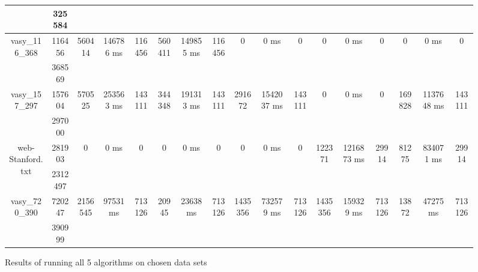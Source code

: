 \documentclass[../master/master.tex]{subfiles}
\begin{document}
\begin{figure}
\begin{tabular}{ |c|c||c|c|c||c|c|c||c|c|c||c|c|c||c|c|c| }
\cline{2-2}
 & 325584  &  &  &  &  &  &  &  &  &  &  &  &  &  &  &  \\
\hline
\multirow{2}{4em}{vasy\_116\_368} & 116456 & \multirow{2}{4em}{560414} & \multirow{2}{4em}{146786 ms} & \multirow{2}{4em}{116456} & \multirow{2}{4em}{560411} & \multirow{2}{4em}{149855 ms} & \multirow{2}{4em}{116456} & \multirow{2}{4em}{0} & \multirow{2}{4em}{0 ms} & \multirow{2}{4em}{0} & \multirow{2}{4em}{0} & \multirow{2}{4em}{0 ms} & \multirow{2}{4em}{0} & \multirow{2}{4em}{0} & \multirow{2}{4em}{0 ms} & \multirow{2}{4em}{0} \\
\cline{2-2}
 & 368569  &  &  &  &  &  &  &  &  &  &  &  &  &  &  &  \\
\hline
\multirow{2}{4em}{vasy\_157\_297} & 157604 & \multirow{2}{4em}{570525} & \multirow{2}{4em}{253563 ms} & \multirow{2}{4em}{143111} & \multirow{2}{4em}{344348} & \multirow{2}{4em}{191313 ms} & \multirow{2}{4em}{143111} & \multirow{2}{4em}{291672} & \multirow{2}{4em}{1542037 ms} & \multirow{2}{4em}{143111} & \multirow{2}{4em}{0} & \multirow{2}{4em}{0 ms} & \multirow{2}{4em}{0} & \multirow{2}{4em}{169828} & \multirow{2}{4em}{1137648 ms} & \multirow{2}{4em}{143111} \\
\cline{2-2}
 & 297000  &  &  &  &  &  &  &  &  &  &  &  &  &  &  &  \\
\hline
\multirow{2}{4em}{web-Stanford.txt} & 281903 & \multirow{2}{4em}{0} & \multirow{2}{4em}{0 ms} & \multirow{2}{4em}{0} & \multirow{2}{4em}{0} & \multirow{2}{4em}{0 ms} & \multirow{2}{4em}{0} & \multirow{2}{4em}{0} & \multirow{2}{4em}{0 ms} & \multirow{2}{4em}{0} & \multirow{2}{4em}{122371} & \multirow{2}{4em}{1216873 ms} & \multirow{2}{4em}{29914} & \multirow{2}{4em}{81275} & \multirow{2}{4em}{834071 ms} & \multirow{2}{4em}{29914} \\
\cline{2-2}
 & 2312497  &  &  &  &  &  &  &  &  &  &  &  &  &  &  &  \\
\hline
\multirow{2}{4em}{vasy\_720\_390} & 720247 & \multirow{2}{4em}{2156545} & \multirow{2}{4em}{97531 ms} & \multirow{2}{4em}{713126} & \multirow{2}{4em}{20945} & \multirow{2}{4em}{23638 ms} & \multirow{2}{4em}{713126} & \multirow{2}{4em}{1435356} & \multirow{2}{4em}{732579 ms} & \multirow{2}{4em}{713126} & \multirow{2}{4em}{1435356} & \multirow{2}{4em}{159329 ms} & \multirow{2}{4em}{713126} & \multirow{2}{4em}{13872} & \multirow{2}{4em}{47275 ms} & \multirow{2}{4em}{713126} \\
\cline{2-2}
 & 390999  &  &  &  &  &  &  &  &  &  &  &  &  &  &  &  \\
\hline
\end{tabular}
\caption{Results of running all 5 algorithms on chosen data sets}
\label{fig:data}
\end{figure}
\end{document}
